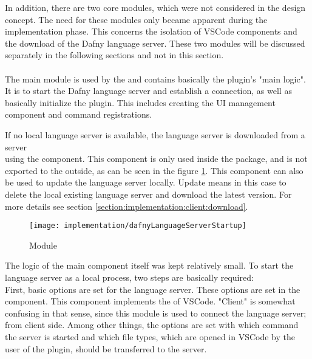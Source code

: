 In addition, there are two core modules, which were not considered in the design concept.
The need for these modules only became apparent during the implementation phase.
This concerns the isolation of VSCode components
and the download of the Dafny language server.
These two modules will be discussed separately in the following sections and not in this section. \\

\textbf{}\\
The main module  is used by the 
and contains basically the plugin's "main logic".
It is to start the Dafny language server and establish a connection,
as well as basically initialize the plugin. This includes creating the UI management component and command registrations.

If no local language server is available, the language server is downloaded from a server \\
using the  component.
This component is only used inside the package, and is not exported to the outside,
as can be seen in the figure \ref{fig:dafnyLanguageServerStartup}.
This component can also be used to update the language server locally.
Update means in this case to delete the local existing language server and download the latest version.
For more details see section \ref{section:implementation:client:download}.

\begin{figure}[H]
    \centering
    \texttt{[image: implementation/dafnyLanguageServerStartup]}
    \caption{Module }
    \label{fig:dafnyLanguageServerStartup}
\end{figure}

The logic of the main component  itself was kept relatively small.
To start the language server as a local process, two steps are basically required:\\

First, basic options are set for the language server.
These options are set in the  component. This component implements the 
of VSCode. "Client" is somewhat confusing in that sense, since this module is used to connect the language server; from client side.
Among other things, the options are set with which command the server is started and which file types, which are opened in VSCode by the user of the plugin, should be transferred to the server. \\

